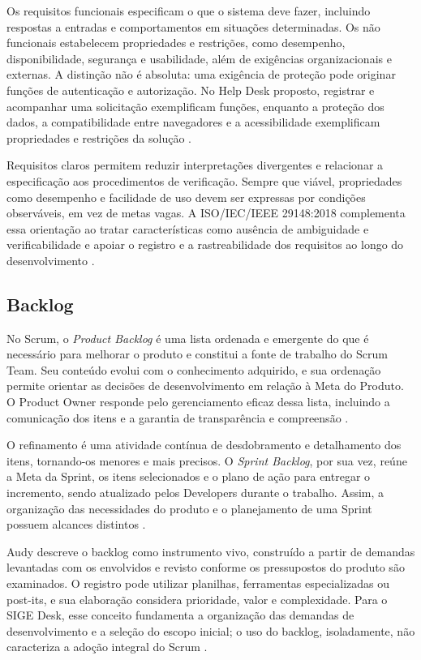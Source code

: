 Os requisitos funcionais especificam o que o sistema deve fazer, incluindo respostas a entradas e comportamentos em situações determinadas. Os não funcionais estabelecem propriedades e restrições, como desempenho, disponibilidade, segurança e usabilidade, além de exigências organizacionais e externas. A distinção não é absoluta: uma exigência de proteção pode originar funções de autenticação e autorização. No Help Desk proposto, registrar e acompanhar uma solicitação exemplificam funções, enquanto a proteção dos dados, a compatibilidade entre navegadores e a acessibilidade exemplificam propriedades e restrições da solução \cite{SOMMERVILLE_2011}.

Requisitos claros permitem reduzir interpretações divergentes e relacionar a especificação aos procedimentos de verificação. Sempre que viável, propriedades como desempenho e facilidade de uso devem ser expressas por condições observáveis, em vez de metas vagas. A ISO/IEC/IEEE 29148:2018 complementa essa orientação ao tratar características como ausência de ambiguidade e verificabilidade e apoiar o registro e a rastreabilidade dos requisitos ao longo do desenvolvimento \cite{SOMMERVILLE_2011,iso29148}.

\subsection{\esp Backlog}

No Scrum, o \textit{Product Backlog} é uma lista ordenada e emergente do que é necessário para melhorar o produto e constitui a fonte de trabalho do Scrum Team. Seu conteúdo evolui com o conhecimento adquirido, e sua ordenação permite orientar as decisões de desenvolvimento em relação à Meta do Produto. O Product Owner responde pelo gerenciamento eficaz dessa lista, incluindo a comunicação dos itens e a garantia de transparência e compreensão \cite{SCHWABER_SUTHERLAND_2020}.

O refinamento é uma atividade contínua de desdobramento e detalhamento dos itens, tornando-os menores e mais precisos. O \textit{Sprint Backlog}, por sua vez, reúne a Meta da Sprint, os itens selecionados e o plano de ação para entregar o incremento, sendo atualizado pelos Developers durante o trabalho. Assim, a organização das necessidades do produto e o planejamento de uma Sprint possuem alcances distintos \cite{SCHWABER_SUTHERLAND_2020}.

Audy descreve o backlog como instrumento vivo, construído a partir de demandas levantadas com os envolvidos e revisto conforme os pressupostos do produto são examinados. O registro pode utilizar planilhas, ferramentas especializadas ou post-its, e sua elaboração considera prioridade, valor e complexidade. Para o SIGE Desk, esse conceito fundamenta a organização das demandas de desenvolvimento e a seleção do escopo inicial; o uso do backlog, isoladamente, não caracteriza a adoção integral do Scrum \cite{AUDY_2015,SCHWABER_SUTHERLAND_2020}.

